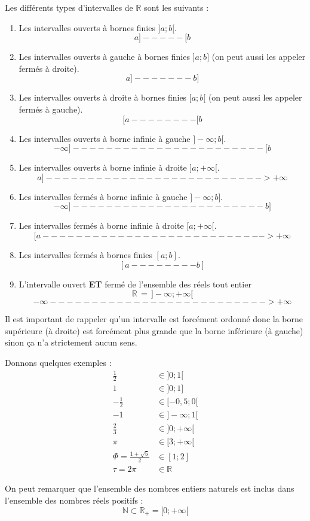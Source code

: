 \documentclass[a4paper, 11pt, twoside]{article}
\newcommand{\R}{\mathbb{R}}
\newcommand{\E}[1]{\mathbb{#1}}
\begin{document}
Les différents types d'intervalles de \(\R\) sont les
suivants :
\begin{enumerate}
\item Les intervalles ouverts à bornes finies \(]a ; b[\).
\[a]-----[b\]
\item Les intervalles ouverts à gauche à bornes finies \(]a ; b]\) (on
peut aussi les appeler fermés à droite).
\[a]-------b]\]
\item Les intervalles ouverts à droite à bornes finies \([a ; b[\) (on
peut aussi les appeler fermés à gauche).
\[[a--------[b\]
\item Les intervalles ouverts à borne infinie à gauche \(]-\infty ;
      b[\).
\[-\infty ]-----------------------[b\]
\item Les intervalles ouverts à borne infinie à droite \(]a ;
      +\infty[\).
\[a]-------------------------->+\infty\]
\item Les intervalles fermés à borne infinie à gauche \(]-\infty ; b]\).
\[-\infty ]-----------------------b]\]
\item Les intervalles fermés à borne infinie à droite \([a ; +\infty[\).
\[[a--------------------------->+\infty\]
\item Les intervalles fermés à bornes finies \([a ; b]\).
\[[a--------b]\]
\item L'intervalle ouvert \textbf{ET} fermé de l'ensemble des réels tout
entier \[\R\,=\,]-\infty ; +\infty[\]
\[-\infty --------------------------> +\infty\]
\end{enumerate}

Il est important de rappeler qu'un intervalle est forcément ordonné
donc la borne supérieure (à droite) est forcément plus grande que
la borne inférieure (à gauche) sinon ça n'a strictement aucun
sens.

Donnons quelques exemples :
\begin{align*}
\frac{1}{2} &\in ]0 ; 1[ \\
1 &\in ]0 ; 1] \\
-\frac{1}{2} &\in [-0,5 ; 0[\\
-1 &\in ]-\infty ; 1[\\
\frac{2}{3} &\in ]0 ; +\infty[ \\
\pi &\in [3 ; +\infty[ \\
\Phi = \frac{1 + \sqrt{5}}{2} &\in [1 ; 2] \\
\tau = 2\pi &\in \R
\end{align*}

On peut remarquer que l'ensemble des nombres entiers naturels est
inclus dans l'ensemble des nombres réels positifs :
\[\E{N}\subset \R_{+} = [0; +\infty[\]
\end{document}
